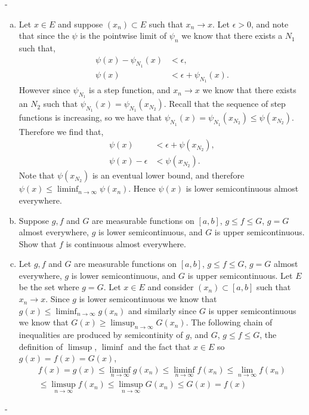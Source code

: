 \documentclass[12pt]{article}
\makeatletter
\theoremstyle{ex215}
\newcounter{probcount}
\newlength\probsep
\newlength\pshrinking
\newenvironment{problems}%
  {\ifhmode\unskip\par\fi\setcounter{probcount}{0}\probsep\parskip
  \sbox\@tempboxa{\textbf{9.}}\pshrinking\wd\@tempboxa\advance\pshrinking\labelsep
  \advance\linewidth -\pshrinking
  \advance\@totalleftmargin\pshrinking
  \advance\leftskip\pshrinking}%
  {\ifhmode\unskip \par\fi\advance\leftskip-\pshrinking}%
\renewenvironment{proof}[1][\proofname]{\par
  \pushQED{\qed}%
  \normalfont \topsep6\p@\@plus6\p@\relax
  \trivlist
  \@topsep \topsep
  \item[\hskip\labelsep
        \itshape
    #1\@addpunct{.}]\ignorespaces
}{%
  \popQED\endtrivlist\@endpefalse
}
\makeatother
\begin{document}
\begin{problems}
\begin{enumerate}[(a)]
\begin{proof}
Let $x \in E$ and suppose $(x_n) \subset E$ such that $x_n \to x$. Let $\epsilon > 0$, and note that since the $\psi$ is the pointwise limit of $\psi_n$ we know that there exists a $N_1$ such that, 
\begin{align*}
  \psi(x) - \psi_{N_1}(x) &< \epsilon,\\
  \psi(x) &< \epsilon + \psi_{N_1}(x).
\end{align*} 
However since $\psi_{N_1}$ is a step function, and $x_n \to x$ we know that there exists an $N_2$
such that $\psi_{N_1}(x) = \psi_{N_1}(x_{N_2})$. Recall that the sequence of step functions is increasing, so we have that $\psi_{N_1}(x) = \psi_{N_1}(x_{N_2}) \leq \psi(x_{N_2})$. Therefore we find that, 
\begin{align*}
  \psi(x) &< \epsilon + \psi(x_{N_2}),\\
  \psi(x) - \epsilon &<  \psi(x_{N_2}).
\end{align*}
Note that $\psi(x_{N_2})$ is an eventual lower bound, and therefore $\psi(x) \leq \liminf_{n \to \infty} \psi(x_n)$. Hence $\psi(x)$ is lower semicontinuous almost everywhere. 
\end{proof}

\item Suppose $g, f$ and $G$ are measurable functions on $[a, b]$, $g \leq f \leq G$, $g = G$ almost everywhere, $g$ is lower semicontinuous, and $G$ is upper semicontinuous. Show that $f$ is continuous almost everywhere. 
\begin{proof} Let $g, f$ and $G$ are measurable functions on $[a, b]$, $g \leq f \leq G$, $g = G$ almost everywhere, $g$ is lower semicontinuous, and $G$ is upper semicontinuous. Let $E$ be the set where $g = G$. Let $x \in E$ and consider $(x_n) \subset [a, b]$ such that $x_n \to x$. Since $g$ is lower semicontinuous we know that $g(x) \leq \liminf_{n \to \infty} g(x_n)$ and similarly since $G$ is upper semicontinuous we know that $G(x) \geq \limsup_{n \to \infty} G(x_n)$. The following chain of inequalities are produced by semicontinity of $g$, and $G$,  $g \leq f \leq G$, the definition of $\limsup$, $\liminf$ and the fact that $x \in E$ so $g(x) = f(x) = G(x)$, 
  \begin{multline*}
    f(x) = g(x) \leq \liminf_{n \to \infty} g(x_n) \leq \liminf_{n \to \infty} f(x_n) \leq \lim_{n \to \infty}f(x_n)\\
     \leq \limsup_{n \to \infty} f(x_n) \leq \limsup_{n \to \infty} G(x_n) \leq G(x) = f(x)
  \end{multline*}
\end{proof}



\end{enumerate}
\end{problems}
\end{document}
